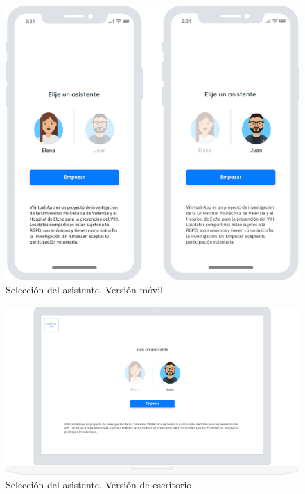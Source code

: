 \begin{figure}[htbp]
\centering
\includegraphics[scale=0.2]{../images/mobile_avatar.png} 
\caption{Selección del asistente. Versión móvil}
\label{fig:mobile avatar}
\end{figure}

\begin{figure}[htbp]
\centering
\includegraphics[scale=0.2]{../images/desktop_avatar.png} 
\caption{Selección del asistente. Versión de escritorio}
\label{fig:desktop avatar}
\end{figure}

